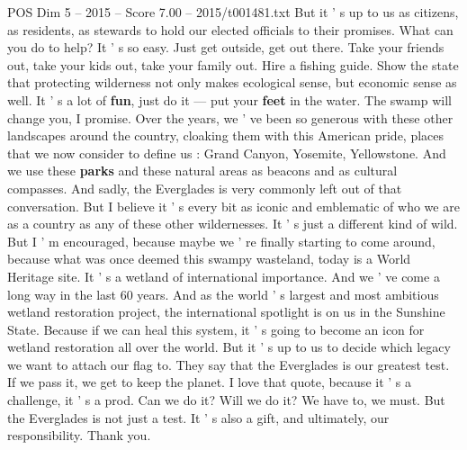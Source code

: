 \begin{textsample}{POS Dim 5 – 2015 – Score 7.00 – 2015/t001481.txt}
But it ' s up to us as citizens, as residents, as stewards to hold our elected officials to their promises.
What can you do to help?
It ' s so easy.
Just get outside, get out there.
Take your friends out, take your kids out, take your family out.
Hire a fishing guide.
Show the state that protecting wilderness not only makes ecological sense, but economic sense as well.
It ' s a lot of \textbf{fun}, just do it — put your \textbf{feet} in the water.
The swamp will change you, I promise.
Over the years, we ' ve been so generous with these other landscapes around the country, cloaking them with this American pride, places that we now consider to define us : Grand Canyon, Yosemite, Yellowstone.
And we use these \textbf{parks} and these natural areas as beacons and as cultural compasses.
And sadly, the Everglades is very commonly left out of that conversation.
But I believe it ' s every bit as iconic and emblematic of who we are as a country as any of these other wildernesses.
It ' s just a different kind of wild.
But I ' m encouraged, because maybe we ' re finally starting to come around, because what was once deemed this swampy wasteland, today is a World Heritage site.
It ' s a wetland of international importance.
And we ' ve come a long way in the last 60 years.
And as the world ' s largest and most ambitious wetland restoration project, the international spotlight is on us in the Sunshine State.
Because if we can heal this system, it ' s going to become an icon for wetland restoration all over the world.
But it ' s up to us to decide which legacy we want to attach our flag to.
They say that the Everglades is our greatest test.
If we pass it, we get to keep the planet.
I love that quote, because it ' s a challenge, it ' s a prod.
Can we do it?
Will we do it?
We have to, we must.
But the Everglades is not just a test.
It ' s also a gift, and ultimately, our responsibility.
Thank you.

\end{textsample}
